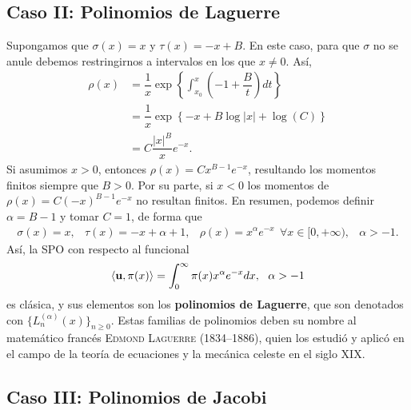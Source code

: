 \subsection{Caso II: Polinomios de Laguerre}

Supongamos que $\sigma(x) = x$ y $\tau(x)=-x+B$. En este caso, para que $\sigma$ no se anule debemos restringirnos a intervalos en los que $x\neq0$. Así,
\begin{equation*}
    \begin{split}
        \rho(x) &= \dfrac 1 x \exp\left\{ \int_{x_0}^x \left(-1+\dfrac B t\right)dt \right\}\\
        &=  \dfrac 1 x \exp\left\{ -x + B\log|x| + \log(C) \right\} \\
        &= C \dfrac{|x|^B}{x}e^{-x}.
    \end{split}
\end{equation*}
Si asumimos $x>0$, entonces $\rho(x)=Cx^{B-1}e^{-x}$, resultando los momentos finitos siempre que $B > 0$. Por su parte, si $x<0$ los momentos de $\rho(x)=C(-x)^{B-1}e^{-x}$ no resultan finitos. En resumen, podemos definir $\alpha=B-1$ y tomar $C=1$, de forma que
\begin{equation}
    \label{eq:parametros-laguerre}
    \begin{array}{cccc}
        \sigma(x)=x, & \tau(x)=-x+\alpha+1, & \rho(x) = x^{\alpha} e^{-x}\ \ \forall x \in[0,+\infty), & \alpha > -1.
    \end{array}
\end{equation}
Así, la SPO con respecto al funcional
\begin{equation}
    \label{eq:func-laguerre}
    \prodesc{\uu}{\pi(x)} = \int_{0}^\infty \pi(x)x^{\alpha} e^{-x}dx, \ \ \alpha > -1
\end{equation}
es clásica, y sus elementos son los \textbf{polinomios de Laguerre}, que son denotados con $\{L_n^{(\alpha)}(x)\}_{n\geq 0}$. Estas familias de polinomios deben su nombre al matemático francés \textsc{Edmond Laguerre} (1834--1886), quien los estudió y aplicó en el campo de la teoría de ecuaciones y la mecánica celeste en el siglo XIX.

\subsection{Caso III: Polinomios de Jacobi}


